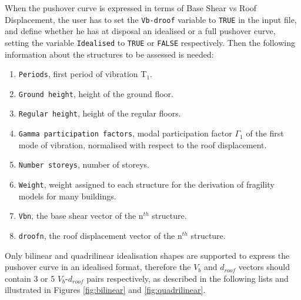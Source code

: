 When the pushover curve is expressed in terms of Base Shear vs Roof Displacement, the user has to set the \verb=Vb-droof= variable to \verb=TRUE= in the input file, and define whether he has at disposal an idealised or a full pushover curve, setting the variable \verb=Idealised= to \verb=TRUE= or \verb=FALSE= respectively. Then the following information about the structures to be assessed is needed:\\

\begin{enumerate}
\item \verb=Periods=, first period of vibration T$_1$.
\item \verb=Ground height=, height of the ground floor.
\item \verb=Regular height=, height of the regular floors.
\item \verb=Gamma participation factors=, modal participation factor $\Gamma_1$ of the first mode of vibration, normalised with respect to the roof displacement.
\item \verb=Number storeys=, number of storeys.
\item \verb=Weight=, weight assigned to each structure for the derivation of fragility models for many buildings.
\item \verb=Vbn=, the base shear vector of the n$^{th}$ structure.
\item \verb=droofn=, the roof displacement vector of the n$^{th}$ structure. \\
\end{enumerate}

Only bilinear and quadrilinear idealisation shapes are supported to express the pushover curve in an idealised format, therefore the $V_b$ and $d_{roof}$ vectors should contain 3 or 5 $V_b$-$d_{roof}$ pairs respectively, as described in the following lists and illustrated in Figures \ref{fig:bilinear} and \ref{fig:quadrilinear}.\\

